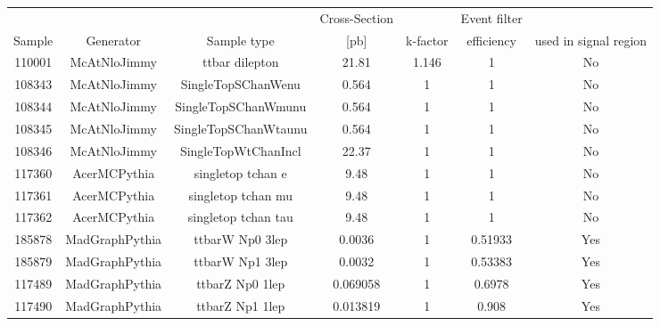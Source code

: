 \begin{table}[ht!]
\centering
  \begin{footnotesize}

\begin{tabular}{c|c|c|c|c|c|c}
\hline
    &  &  & Cross-Section &  & Event filter  \\
  Sample  & Generator & Sample type & [pb] & k-factor &  efficiency  & used in signal region\\
\hline \hline
110001 & McAtNloJimmy & ttbar dilepton 		 &  21.81  &  1.146  &  1  & No \\
108343 & McAtNloJimmy & SingleTopSChanWenu   &  0.564  &  1  &  1  & No \\
108344 & McAtNloJimmy & SingleTopSChanWmunu  &  0.564  &  1  &  1  & No \\
108345 & McAtNloJimmy & SingleTopSChanWtaunu &  0.564  &  1  &  1  & No \\
108346 & McAtNloJimmy & SingleTopWtChanIncl  &  22.37  &  1  &  1  & No \\
117360 & AcerMCPythia & singletop tchan e  	 &  9.48  &  1  &  1  & No \\
117361 & AcerMCPythia & singletop tchan mu  	 &  9.48  &  1  &  1  & No \\
117362 & AcerMCPythia & singletop tchan tau   &  9.48  &  1  &  1  & No \\
185878 & MadGraphPythia & ttbarW Np0 3lep & 0.0036 & 1 & 0.51933 & Yes \\
185879 & MadGraphPythia & ttbarW Np1 3lep & 0.0032 & 1 & 0.53383 & Yes \\
117489 & MadGraphPythia & ttbarZ Np0 1lep & 0.069058 & 1 & 0.6978 & Yes \\
117490 & MadGraphPythia & ttbarZ Np1 1lep & 0.013819 & 1 & 0.908 & Yes \\

\hline 
\end{tabular}
  \end{footnotesize}


\end{table}
